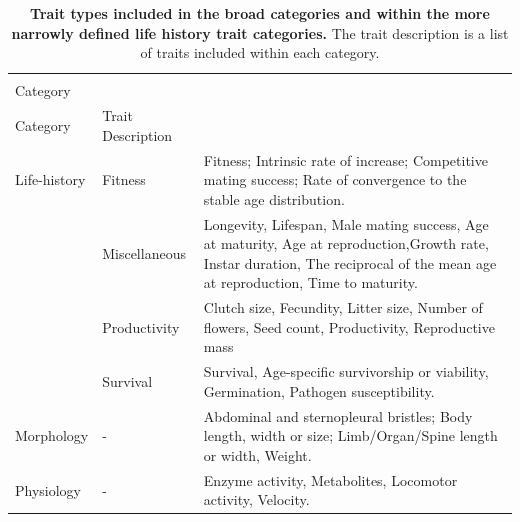 

\newpage
\begin{table}[!ht]
    \caption[Trait types included in the broad categories and within the more narrowly defined life history trait categories.]{\textbf{Trait types included in the broad categories and within the more narrowly defined life history trait categories.} The trait description is a list of traits included within each category.}
    \centering
    \small
    \renewcommand{\arraystretch}{1.45}
    \begin{tabular}{>{\centering\arraybackslash}p{2cm}>{\centering\arraybackslash}p{2.8cm}>{\centering\arraybackslash}p{10.2cm}}
    \toprule
         {\centering Broad \\ Category} & {\centering Narrow \\ Category} & Trait Description\\
    \midrule
Life-history & 
Fitness & Fitness; Intrinsic rate of increase; Competitive mating success; Rate of convergence to the stable age distribution. \\
& Miscellaneous & Longevity, Lifespan, Male mating success, Age at maturity, Age at reproduction,Growth rate, Instar duration, The reciprocal of the mean age at reproduction, Time to maturity.\\
    & Productivity & Clutch size, Fecundity, Litter size, Number of flowers, Seed count, Productivity,
Reproductive mass\\
    & Survival & Survival, Age-specific survivorship or viability,  Germination, Pathogen susceptibility.\\
Morphology & - & Abdominal and sternopleural bristles; Body length, width or size; Limb/Organ/Spine length or width, Weight.\\
Physiology & - &  Enzyme activity, Metabolites, Locomotor activity, Velocity.\\
    \bottomrule
    \end{tabular}
    \label{tab:TraitTypes}
\end{table}

